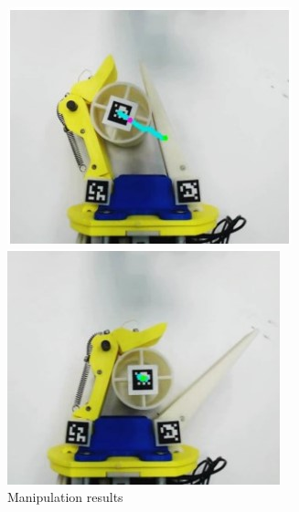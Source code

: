 \documentclass[a4paper,twoside,12pt,papersize, dvipdfmx]{iirthesis}
\begin{document}
\begin{figure}[b]
\begin{minipage}{0.24\hsize}
\subcaption{}
\end{minipage}	\hfill
\begin{minipage}{0.24\hsize}
\centering
\includegraphics[width=\hsize]{fig/1-introduction/bircher/mani_c.jpg}
\subcaption{}
\end{minipage}	\hfill
\begin{minipage}{0.24\hsize}
\centering
\includegraphics[width=\hsize]{fig/1-introduction/bircher/mani_d.jpg}
\subcaption{}
\end{minipage}	\hfill
\caption{Manipulation results \cite{bircher2019}}
\label{fig::manires}
\end{figure}
\end{document}
